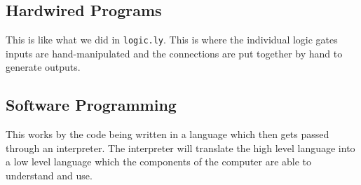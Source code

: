 \subsection{Hardwired Programs}
This is like what we did in \texttt{logic.ly}. This is where the individual logic gates inputs are hand-manipulated and the connections are put together by hand to generate outputs.

\subsection{Software Programming}
This works by the code being written in a language which then gets passed through an interpreter. The interpreter will translate the high level language into a low level language which the components of the computer are able to understand and use. 